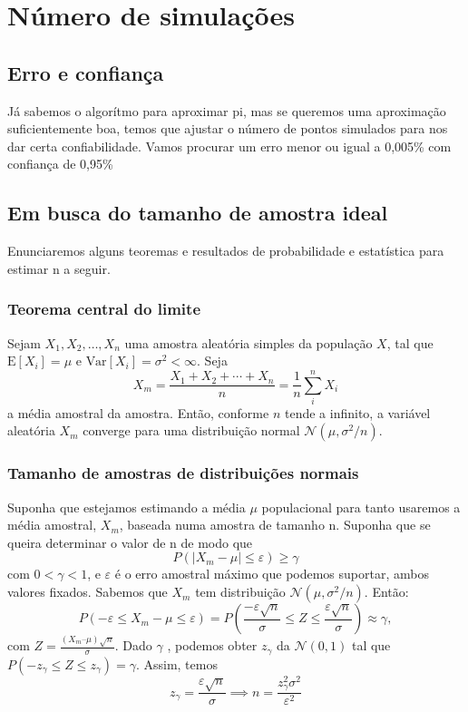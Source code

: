 \documentclass{article}
\begin{document}
\section{Número de simulações}

\subsection{Erro e confiança}

Já sabemos o algorítmo para aproximar pi, mas se queremos uma aproximação suficientemente boa, temos que ajustar o número de pontos simulados para nos dar certa confiabilidade. Vamos procurar um erro menor ou igual a 0,005\% com confiança de 0,95\% 

\newpage
\subsection{Em busca do tamanho de amostra ideal}

Enunciaremos alguns teoremas e resultados de probabilidade e estatística para estimar n a seguir. 

\subsubsection{Teorema central do limite}

Sejam $X_1, X_2, \ldots, X_n$ uma amostra aleatória simples da população $X$, tal que $\text{E}[X_i] = \mu$ e $\text{Var}[X_i] = \sigma^2 < \infty$. Seja
\[X_m = \frac{X_1 + X_2 + \cdots + X_n}{n}
      = \frac{1}{n}\sum_{i}^{n} X_i\]
a média amostral da amostra. Então, conforme $n$ tende a infinito, a variável aleatória $X_m$ converge para uma distribuição normal $\mathcal{N}(\mu, \sigma^2/n)$.

\subsubsection{Tamanho de amostras de distribuições normais}

Suponha que estejamos estimando a média $\mu$ populacional para tanto usaremos a média amostral, $X_m$, baseada numa amostra de tamanho n. Suponha
que se queira determinar o valor de n de modo que \\
\[P(|X_m - \mu| \leq \varepsilon) \geq \gamma \] 
com $0 < \gamma < 1$, e $\varepsilon$ é o erro amostral máximo que podemos suportar, ambos valores fixados.
Sabemos que $X_m$ tem distribuição $\mathcal{N}(\mu, \sigma^2/n)$. Então: \\
\[ P(-\varepsilon \leq X_m - \mu \leq \varepsilon) = P(\frac{-\varepsilon \sqrt{n}}{\sigma} \leq Z \leq \frac{\varepsilon \sqrt{n}}{\sigma} ) \approx \gamma , \]
com $Z = \frac{(X_m–\mu)\sqrt{n}}{\sigma}$.
Dado $\gamma$ , podemos obter $z_\gamma$ da $\mathcal{N}(0,1)$ tal que $P(-z_\gamma \leq Z \leq z_\gamma)=\gamma$. Assim, temos
\begin{equation}
   z_\gamma = \frac{\varepsilon \sqrt{n}}{\sigma} \implies
n = \frac{z_\gamma^2 \sigma^2}{\varepsilon^2}
\end{equation}
\end{document}
